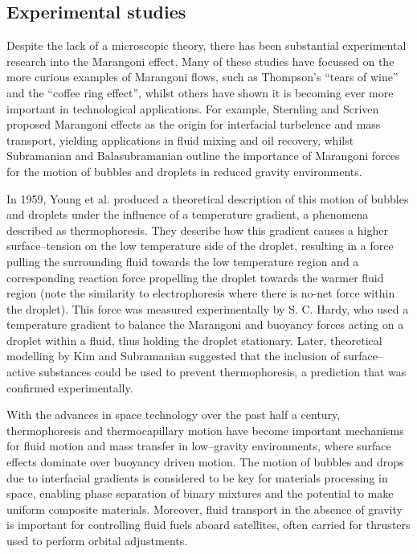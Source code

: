 \subsection{Experimental studies}
Despite the lack of a microscopic theory, there has been substantial experimental research into the Marangoni effect.
Many of these studies have focussed on the more curious examples of Marangoni flows, such as Thompson's ``tears of wine''\cite{JThompson,Venerus,Tadmor,Cazabat1995} and the ``coffee ring effect'',\cite{Sefian,HuLarson,Sefiane2014} whilst others have shown it is becoming ever more important in technological applications.
For example, Sternling and Scriven\cite{SternlingScriven} proposed Marangoni effects as the origin for interfacial turbelence and mass transport, yielding applications in fluid mixing and oil recovery,\cite{Aguilera2005,LyfordA,LyfordB} whilst Subramanian and Balasubramanian outline the importance of Marangoni forces for the motion of bubbles and droplets in reduced gravity environments.\cite{MotionOfBubblesAndDrops} 

In 1959, Young et al. produced a theoretical description of this motion of bubbles and droplets under the influence of a temperature gradient, a phenomena described as thermophoresis.\cite{Young1959}
They describe how this gradient causes a higher surface--tension on the low temperature side of the droplet, resulting in a force pulling the surrounding fluid towards the low temperature region and a corresponding reaction force propelling the droplet towards the warmer fluid region (note the similarity to electrophoresis where there is no-net force within the droplet).
This force was measured experimentally by S. C. Hardy,\cite{Hardy1978} who used a temperature gradient to balance the Marangoni and buoyancy forces acting on a droplet within a fluid, thus holding the droplet stationary.
Later, theoretical modelling by Kim and Subramanian suggested that the inclusion of surface--active substances could be used to prevent thermophoresis,\cite{KimSubramanianA,KimSubramanianB} a prediction that was confirmed experimentally.\cite{BartonSubramanian,ChenStebe}

With the advances in space technology over the past half a century, thermophoresis and thermocapillary motion have become important mechanisms for fluid motion and mass transfer in low--gravity environments, where surface effects dominate over buoyancy driven motion.
The motion of bubbles and drops due to interfacial gradients is considered to be key for materials processing in space, enabling phase separation of binary mixtures and the potential to make uniform composite materials.\cite{BartonSubramanian}
Moreover, fluid transport in the absence of gravity is important for controlling fluid fuels aboard satellites, often carried for thrusters used to perform orbital adjustments.\cite{MotionOfBubblesAndDrops} 


